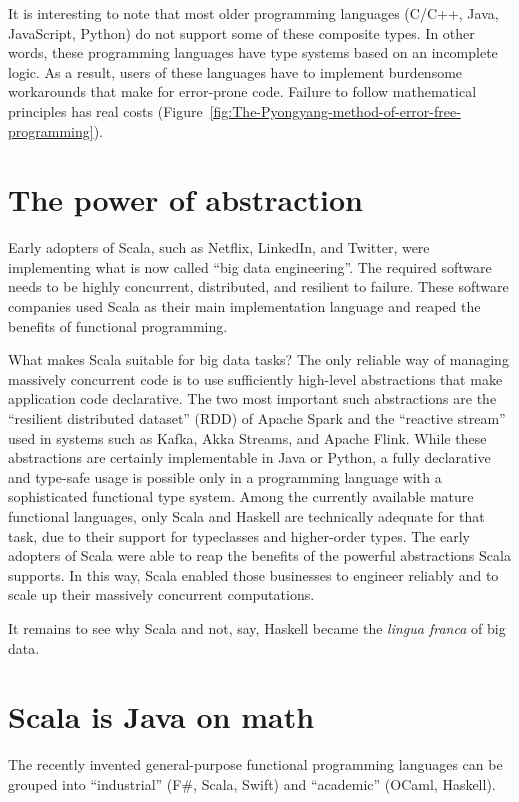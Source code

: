 It is interesting to note that most older programming languages (C/C++,
Java, JavaScript, Python) do not support some of these composite types.
In other words, these programming languages have type systems based
on an incomplete logic. As a result, users of these languages have
to implement burdensome workarounds that make for error-prone code.
Failure to follow mathematical principles has real costs (Figure~\ref{fig:The-Pyongyang-method-of-error-free-programming}).

\section{The power of abstraction}

Early adopters of Scala, such as Netflix, LinkedIn, and Twitter, were
implementing what is now called ``big data engineering''. The required
software needs to be highly concurrent, distributed, and resilient
to failure. These software companies used Scala as their main implementation
language and reaped the benefits of functional programming.

What makes Scala suitable for big data tasks? The only reliable way
of managing massively concurrent code is to use sufficiently high-level
abstractions that make application code declarative. The two most
important such abstractions are the ``resilient distributed dataset''
(RDD) of Apache Spark and the ``reactive stream'' used in systems
such as Kafka, Akka Streams, and Apache Flink. While these abstractions
are certainly implementable in Java or Python, a fully declarative
and type-safe usage is possible only in a programming language with
a sophisticated functional type system. Among the currently available
mature functional languages, only Scala and Haskell are technically
adequate for that task, due to their support for typeclasses and higher-order
types. The early adopters of Scala were able to reap the benefits
of the powerful abstractions Scala supports. In this way, Scala enabled
those businesses to engineer reliably and to scale up their massively
concurrent computations.

It remains to see why Scala and not, say, Haskell became the \emph{lingua
franca} of big data.

\section{Scala is Java on math }

The recently invented general-purpose functional programming languages
can be grouped into ``industrial'' (F\#, Scala, Swift) and ``academic''
(OCaml, Haskell).

